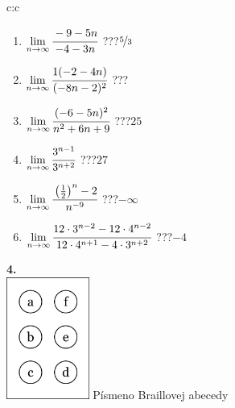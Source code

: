 \documentclass[10pt]{report}
\begin{document}
\begin{tabular}{c:c}
\begin{minipage}[c][104.5mm][t]{0.5\linewidth}
\begin{center}
\begin{minipage}{0.79\linewidth}
\begin{center}
\begin{varwidth}{\linewidth}
\begin{enumerate}
\normalsize
\item $\lim\limits_{n\to\infty}\cfrac{-9-5n}{-4-3n}$\quad \dotfill\; ???\;\dotfill \quad $\nicefrac{5}{3}$
\item $\lim\limits_{n\to\infty}\cfrac{1(-2-4n)}{(-8n-2)^2}$\quad \dotfill\; ???\;\dotfill {}
\item $\lim\limits_{n\to\infty}\cfrac{(-6-5n)^2}{n^2+6n+9}$\quad \dotfill\; ???\;\dotfill \quad $25$
\item $\lim\limits_{n\to\infty}\cfrac{3^{n-1}}{3^{n+2}}$\quad \dotfill\; ???\;\dotfill \quad $27$
\item $\lim\limits_{n\to\infty}\cfrac{\left(\frac{1}{2}\right)^n -2}{n^{-9}}$\quad \dotfill\; ???\;\dotfill \quad $-\infty$
\item $\lim\limits_{n\to\infty}\cfrac{12\cdot 3^{n-2}-12\cdot 4^{n-2}}{12\cdot 4^{n+1}-4\cdot 3^{n+2}}$\quad \dotfill\; ???\;\dotfill \quad $-4$
\end{enumerate}
\end{varwidth}
\end{center}
\end{minipage}
\begin{minipage}{0.20\linewidth}
\begin{center}
{\Huge\bfseries 4.} \\[2mm]
\includegraphics[height=40mm]{../images/braille.png}
{\small Písmeno Braillovej abecedy}
\end{center}
\end{minipage}
\end{center}
\end{minipage}
%
\end{tabular}
\newpage
\thispagestyle{empty}
\end{document}
